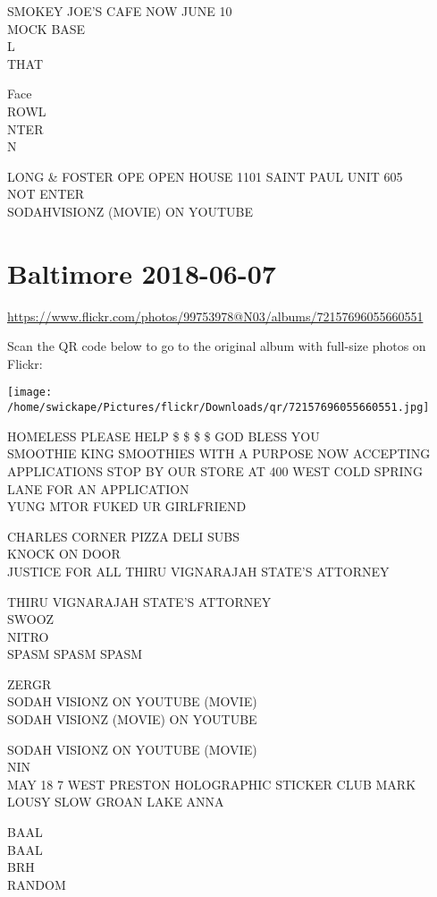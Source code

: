 \documentclass[10pt,letterpaper]{article}
\begin{document}
SMOKEY JOE'S CAFE NOW JUNE 10\\
MOCK BASE\\
L\\
THAT

Face\\
ROWL\\
NTER\\
N

LONG \& FOSTER OPE OPEN HOUSE 1101 SAINT PAUL UNIT 605\\
NOT ENTER\\
SODAHVISIONZ (MOVIE) ON YOUTUBE


\section*{Baltimore 2018-06-07}

\url{https://www.flickr.com/photos/99753978@N03/albums/72157696055660551}

Scan the QR code below to go to the original album with full-size photos on Flickr:

\texttt{[image: /home/swickape/Pictures/flickr/Downloads/qr/72157696055660551.jpg]}


HOMELESS PLEASE HELP \$ \$ \$ \$ GOD BLESS YOU\\
SMOOTHIE KING SMOOTHIES WITH A PURPOSE NOW ACCEPTING APPLICATIONS STOP BY OUR STORE AT 400 WEST COLD SPRING LANE FOR AN APPLICATION\\
YUNG MTOR FUKED UR GIRLFRIEND

CHARLES CORNER PIZZA DELI SUBS\\
KNOCK ON DOOR\\
JUSTICE FOR ALL THIRU VIGNARAJAH STATE'S ATTORNEY

THIRU VIGNARAJAH STATE'S ATTORNEY\\
SWOOZ\\
NITRO\\
SPASM SPASM SPASM

ZERGR\\
SODAH VISIONZ ON YOUTUBE (MOVIE)\\
SODAH VISIONZ (MOVIE) ON YOUTUBE

SODAH VISIONZ ON YOUTUBE (MOVIE)\\
NIN\\
MAY 18 7 WEST PRESTON HOLOGRAPHIC STICKER CLUB MARK LOUSY SLOW GROAN LAKE ANNA

BAAL\\
BAAL\\
BRH\\
RANDOM
\end{document}
